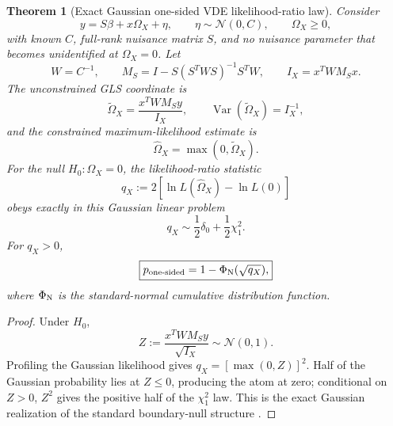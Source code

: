 \documentclass[11pt,a4paper]{article}
\numberwithin{equation}{section}
\theoremstyle{definition}
\theoremstyle{plain}
\newtheorem{theorem}[criterion]{Theorem}
\theoremstyle{remark}
\begin{document}
\begin{theorem}[Exact Gaussian one-sided VDE likelihood-ratio law]
Consider
\begin{equation}
y=S\beta+x\Omega_X+\eta,
\qquad
\eta\sim\mathcal N(0,C),
\qquad
\Omega_X\ge0,
\end{equation}
with known \(C\), full-rank nuisance matrix \(S\), and no nuisance parameter that becomes unidentified at \(\Omega_X=0\). Let
\begin{equation}
W=C^{-1},
\qquad
M_S=I-S(S^TWS)^{-1}S^TW,
\qquad
I_X=x^TWM_Sx.
\end{equation}
The unconstrained GLS coordinate is
\begin{equation}
\widetilde\Omega_X=\frac{x^TWM_Sy}{I_X},
\qquad
\operatorname{Var}(\widetilde\Omega_X)=I_X^{-1},
\end{equation}
and the constrained maximum-likelihood estimate is
\begin{equation}
\boxed{\widehat\Omega_X=\max(0,\widetilde\Omega_X).}
\end{equation}
For the null \(H_0:\Omega_X=0\), the likelihood-ratio statistic
\begin{equation}
q_X:=2\left[\ln L(\widehat\Omega_X)-\ln L(0)\right]
\end{equation}
obeys exactly in this Gaussian linear problem
\begin{equation}
\boxed{q_X\sim\frac12\delta_0+\frac12\chi_1^2.}
\end{equation}
For \(q_X>0\),
\begin{equation}
\boxed{p_{\rm one\text{-}sided}=1-\Phi_{\rm N}(\sqrt{q_X}),}
\end{equation}
where \(\Phi_{\rm N}\) is the standard-normal cumulative distribution function.
\end{theorem}
\begin{proof}
Under \(H_0\),
\begin{equation}
Z:=\frac{x^TWM_Sy}{\sqrt{I_X}}\sim\mathcal N(0,1).
\end{equation}
Profiling the Gaussian likelihood gives \(q_X=[\max(0,Z)]^2\). Half of the Gaussian probability lies at \(Z\le0\), producing the atom at zero; conditional on \(Z>0\), \(Z^2\) gives the positive half of the \(\chi_1^2\) law. This is the exact Gaussian realization of the standard boundary-null structure \cite{Chernoff1954,SelfLiang1987}.
\end{proof}
\end{document}
